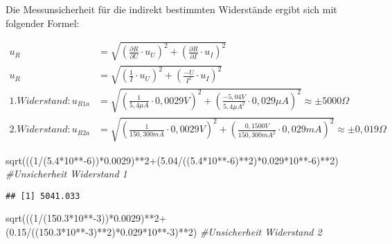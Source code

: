 \documentclass[
  9pt,
]{article}
\newenvironment{Shaded}{\begin{snugshade}}{\end{snugshade}}
\newcommand{\CommentTok}[1]{\textcolor[rgb]{0.56,0.35,0.01}{\textit{#1}}}
\newcommand{\DecValTok}[1]{\textcolor[rgb]{0.00,0.00,0.81}{#1}}
\newcommand{\FloatTok}[1]{\textcolor[rgb]{0.00,0.00,0.81}{#1}}
\newcommand{\FunctionTok}[1]{\textcolor[rgb]{0.00,0.00,0.00}{#1}}
\newcommand{\NormalTok}[1]{#1}
\newcommand{\SpecialCharTok}[1]{\textcolor[rgb]{0.00,0.00,0.00}{#1}}
\begin{document}
Die Messunsicherheit für die indirekt bestimmten Widerstände ergibt sich
mit folgender Formel:

\begin {equation*}
\begin{split}
u_R &= \sqrt{\left (\frac{\partial R}{\partial U} \cdot u_U\right )^2 + \left (\frac{\partial R}{\partial I} \cdot u_I\right )^2 } \\
u_R &= \sqrt{\left (\frac{1}{I} \cdot u_U\right )^2 + \left (\frac{-U}{I^2} \cdot u_I\right )^2 } \\
1.Widerstand: u_{R1a}&= \sqrt{\left (\frac{1}{5,4\mu A} \cdot 0,0029V\right )^2 + \left (\frac{-5,04V}{5,4\mu A^2} \cdot 0,029 \mu A\right )^2 } \approx \pm 5000\Omega \\
2.Widerstand: u_{R2a}&= \sqrt{\left (\frac{1}{150,300mA} \cdot 0,0029V \right )^2 + \left (\frac{0,1500V}{150,300mA^2} \cdot 0,029mA\right )^2 } \approx \pm 0,019 \Omega
\end{split}
\end{equation*}

\begin{Shaded}
\begin{Highlighting}[]
\FunctionTok{sqrt}\NormalTok{(((}\DecValTok{1}\SpecialCharTok{/}\NormalTok{(}\FloatTok{5.4}\SpecialCharTok{*}\DecValTok{10}\SpecialCharTok{**{-}}\DecValTok{6}\NormalTok{))}\SpecialCharTok{*}\FloatTok{0.0029}\NormalTok{)}\SpecialCharTok{**}\DecValTok{2}\SpecialCharTok{+}\NormalTok{(}\FloatTok{5.04}\SpecialCharTok{/}\NormalTok{((}\FloatTok{5.4}\SpecialCharTok{*}\DecValTok{10}\SpecialCharTok{**{-}}\DecValTok{6}\NormalTok{)}\SpecialCharTok{**}\DecValTok{2}\NormalTok{)}\SpecialCharTok{*}\FloatTok{0.029}\SpecialCharTok{*}\DecValTok{10}\SpecialCharTok{**{-}}\DecValTok{6}\NormalTok{)}\SpecialCharTok{**}\DecValTok{2}\NormalTok{) }\CommentTok{\#Unsicherheit Widerstand 1}
\end{Highlighting}
\end{Shaded}

\begin{verbatim}
## [1] 5041.033
\end{verbatim}

\begin{Shaded}
\begin{Highlighting}[]
\FunctionTok{sqrt}\NormalTok{(((}\DecValTok{1}\SpecialCharTok{/}\NormalTok{(}\FloatTok{150.3}\SpecialCharTok{*}\DecValTok{10}\SpecialCharTok{**{-}}\DecValTok{3}\NormalTok{))}\SpecialCharTok{*}\FloatTok{0.0029}\NormalTok{)}\SpecialCharTok{**}\DecValTok{2}\SpecialCharTok{+}\NormalTok{(}\FloatTok{0.15}\SpecialCharTok{/}\NormalTok{((}\FloatTok{150.3}\SpecialCharTok{*}\DecValTok{10}\SpecialCharTok{**{-}}\DecValTok{3}\NormalTok{)}\SpecialCharTok{**}\DecValTok{2}\NormalTok{)}\SpecialCharTok{*}\FloatTok{0.029}\SpecialCharTok{*}\DecValTok{10}\SpecialCharTok{**{-}}\DecValTok{3}\NormalTok{)}\SpecialCharTok{**}\DecValTok{2}\NormalTok{) }\CommentTok{\#Unsicherheit Widerstand 2}
\end{Highlighting}
\end{Shaded}
\end{document}
